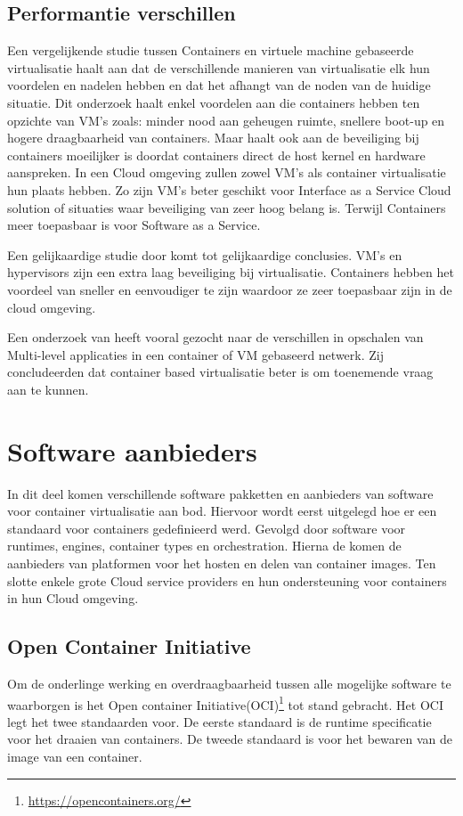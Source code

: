 \subsection{Performantie verschillen}
Een vergelijkende studie tussen Containers en virtuele machine gebaseerde virtualisatie\autocite{Yadav2018} haalt aan dat de verschillende manieren van virtualisatie elk hun voordelen en nadelen hebben en dat het afhangt van de noden van de huidige situatie. Dit onderzoek haalt enkel voordelen aan die containers hebben ten opzichte van VM’s zoals: minder nood aan geheugen ruimte, snellere boot-up en hogere draagbaarheid van containers. Maar haalt ook aan de beveiliging bij containers moeilijker is doordat containers direct de host kernel en hardware aanspreken. In een Cloud omgeving zullen zowel VM’s als container virtualisatie hun plaats hebben. Zo zijn VM’s beter geschikt voor Interface as a Service Cloud solution of situaties waar beveiliging van zeer hoog belang is. Terwijl Containers meer toepasbaar is voor Software as a Service.

Een gelijkaardige studie door \textcite{Eder2016} komt tot gelijkaardige conclusies. VM’s en hypervisors zijn een extra laag beveiliging bij virtualisatie. Containers hebben het voordeel van sneller en eenvoudiger te zijn waardoor ze zeer toepasbaar zijn in de cloud omgeving.

Een onderzoek van \textcite{Abdullah2019} heeft vooral gezocht naar de verschillen in opschalen van Multi-level applicaties in een container of VM gebaseerd netwerk. Zij concludeerden dat container based virtualisatie beter is om toenemende vraag aan te kunnen.


\section{Software aanbieders}
In dit deel komen verschillende software pakketten en aanbieders van software voor container virtualisatie aan bod. Hiervoor wordt eerst uitgelegd hoe er een standaard voor containers gedefinieerd werd. Gevolgd door software voor runtimes, engines, container types en orchestration.  Hierna de komen de aanbieders van platformen voor het hosten en delen van container images. Ten slotte enkele grote Cloud service providers en hun ondersteuning voor containers in hun Cloud omgeving.


\subsection{Open Container Initiative}
Om de onderlinge werking en overdraagbaarheid tussen alle mogelijke software te waarborgen is het Open container Initiative(OCI)\footnote{\url{https://opencontainers.org/}} tot stand gebracht. Het OCI legt het twee standaarden voor. De eerste standaard is de runtime specificatie voor het draaien van containers. De tweede standaard is voor het bewaren van de image van een container. 


